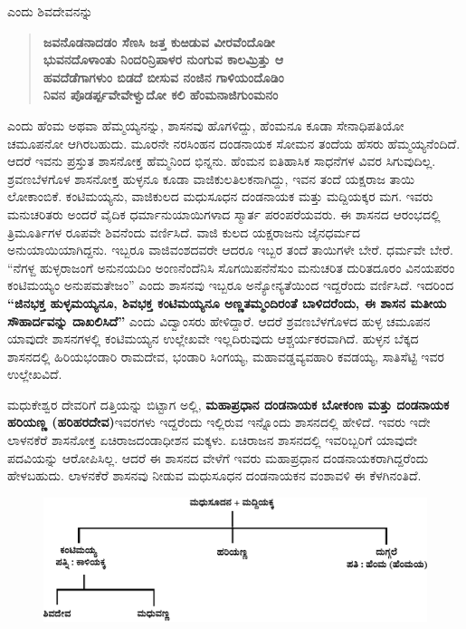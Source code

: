 \noindent
ಎಂದು ಶಿವದೇವನನ್ನು

\begin{verse}
\textbf{ಜವನೊಡನಾದಡಂ ಸೆಣಸಿ ಜತ್ತ ಕುಱಡುವ ವೀರವೆಂದೊಡೀ} \\\textbf{ ಭುವನದೊಳಾಂತು ನಿಂದರಿನ್ರಿಪಾಳರ ನುಂಗುವ ಕಾಲಮ್ರಿತ್ತು ಆ} \\\textbf{ ಹವದೆಡೆಗಾಗಳುಂ ಬಿಡದೆ ಬೀಸುವ ನಂಜಿನ ಗಾಳಿಯಂದೊಡಿಂ} \\\textbf{ ನಿವನ ಪೊಡರ್ಪ್ಪವೇವೇಳ್ವುದೋ ಕಲಿ ಹೆಂಮನಾಜಿಗುಂಮನಂ}
\end{verse}

\noindent
ಎಂದು ಹೆಂಮ ಅಥವಾ ಹೆಮ್ಮಯ್ಯನನ್ನು, ಶಾಸನವು ಹೊಗಳಿದ್ದು, ಹೆಂಮನೂ ಕೂಡಾ ಸೇನಾಧಿಪತಿಯೋ ಚಮೂಪನೋ ಆಗಿರಬಹುದು. ಮೂರನೇ ನರಸಿಂಹನ ದಂಡನಾಯಕ ಸೋಮನ ತಂದೆಯ ಹೆಸರು ಹೆಮ್ಮಯ್ಯನೆಂದಿದೆ. ಆದರೆ ಇವನು ಪ್ರಸ್ತುತ ಶಾಸನೋಕ್ತ ಹೆಮ್ಮನಿಂದ ಭಿನ್ನನು. ಹೆಂಮನ ಐತಿಹಾಸಿಕ ಸಾಧನೆಗಳ ವಿವರ ಸಿಗುವುದಿಲ್ಲ. ಶ್ರವಣಬೆಳಗೊಳ ಶಾಸನೋಕ್ತ ಹುಳ್ಳನೂ ಕೂಡಾ ವಾಜಿಕುಲತಿಲಕನಾಗಿದ್ದು, ಇವನ ತಂದೆ ಯಕ್ಷರಾಜ ತಾಯಿ ಲೋಕಾಂಬಿಕೆ. ಕಂಟಿಮಯ್ಯನು, ವಾಜಿಕುಲದ ಮಧುಸೂಧನ ದಂಡನಾಯಕ ಮತ್ತು ಮದ್ದಿಯಕ್ಕರ ಮಗ. ಇವರು ಮನುಚರಿತರು ಅಂದರೆ ವೈದಿಕ ಧರ್ಮಾನುಯಾಯಿಗಳಾದ ಸ್ಮಾರ್ತ ಪರಂಪರೆಯವರು. ಈ ಶಾಸನದ ಆರಂಭದಲ್ಲಿ ತ್ರಿಮೂರ್ತಿಗಳ ರೂಪವೇ ಶಿವನೆಂದು ವರ್ಣಿಸಿದೆ. ವಾಜಿ ಕುಲದ ಯಕ್ಷರಾಜನು ಜೈನಧರ್ಮದ ಅನುಯಾಯಿಯಾಗಿದ್ದನು. ಇಬ್ಬರೂ ವಾಜಿವಂಶದವರೇ ಆದರೂ ಇಬ್ಬರ ತಂದೆ ತಾಯಿಗಳೇ ಬೇರೆ. ಧರ್ಮವೇ ಬೇರೆ. “ನೆಗಳ್ದ ಹುಳ್ಳರಾಜಂಗೆ ಅನುನಯದಿಂ ಅಂಣನೆಂದೆನಿಸಿ ಸೊಗಯಿಪನೆನೆಸುಂ ಮನುಚರಿತ ದುರಿತದೂರಂ ವಿನಯಪರಂ ಕಂಟಿಮಯ್ಯಂ ಅನುಪಮತೇಜಂ” ಎಂದು ಶಾಸನವು ಇಬ್ಬರೂ ಅನ್ಯೋನ್ಯತೆಯಿಂದ ಇದ್ದರೆಂದು ವರ್ಣಿಸಿದೆ. ಇದರಿಂದ \textbf{“ಜಿನಭಕ್ತ ಹುಳ್ಳಮಯ್ಯನೂ, ಶಿವಭಕ್ತ ಕಂಟಿಮಯ್ಯನೂ ಅಣ್ಣತಮ್ಮಂದಿರಂತೆ ಬಾಳಿದರೆಂದು, ಈ ಶಾಸನ ಮತೀಯ ಸೌಹಾರ್ದವನ್ನು ದಾಖಲಿಸಿದೆ”} ಎಂದು ವಿದ್ವಾಂಸರು ಹೇಳಿದ್ದಾರೆ. ಆದರೆ ಶ್ರವಣಬೆಳಗೊಳದ ಹುಳ್ಳ ಚಮೂಪನ ಯಾವುದೇ ಶಾಸನಗಳಲ್ಲಿ ಕಂಟಿಮಯ್ಯನ ಉಲ್ಲೇಖವೇ ಇಲ್ಲದಿರುವುದು ಆಶ್ಚರ್ಯಕರವಾಗಿದೆ. ಹುಳ್ಳನ ಬೆಕ್ಕದ ಶಾಸನದಲ್ಲಿ ಹಿರಿಯಭಂಡಾರಿ ರಾಮದೇವ, ಭಂಡಾರಿ ಸಿಂಗಯ್ಯ, ಮಹಾವಡ್ಡವ್ಯವಹಾರಿ ಕವಡಯ್ಯ, ಸಾತಿಸೆಟ್ಟಿ ಇವರ ಉಲ್ಲೇಖವಿದೆ.

ಮಧುಕೇಶ್ವರ ದೇವರಿಗೆ ದತ್ತಿಯನ್ನು ಬಿಟ್ಟಾಗ ಅಲ್ಲಿ, \textbf{ಮಹಾಪ್ರಧಾನ ದಂಡನಾಯಕ ಬೋಕಂಣ ಮತ್ತು ದಂಡನಾಯಕ ಹರಿಯಣ್ಣ (ಹರಿಹರದೇವ)}ಇವರಗಳು ಇದ್ದರೆಂದು ಇಲ್ಲಿರುವ ಇನ್ನೊಂದು ಶಾಸನದಲ್ಲಿ ಹೇಳಿದೆ. ಇವರು ಇದೇ ಲಾಳನಕೆರೆ ಶಾಸನೋಕ್ತ ಏಚಿರಾಜದಂಡಾಧೀಶನ ಮಕ್ಕಳು. ಏಚಿರಾಜನ ಶಾಸನದಲ್ಲಿ ಇವರಿಬ್ಬರಿಗೆ ಯಾವುದೇ ಪದವಿಯನ್ನು ಆರೋಪಿಸಿಲ್ಲ. ಆದರೆ ಈ ಶಾಸನದ ವೇಳೆಗೆ ಇವರು ಮಹಾಪ್ರಧಾನ ದಂಡನಾಯಕರಾಗಿದ್ದರೆಂದು ಹೇಳಬಹುದು. ಲಾಳನಕೆರೆ ಶಾಸನವು ನೀಡುವ ಮಧುಸೂಧನ ದಂಡನಾಯಕನ ವಂಶಾವಳಿ ಈ ಕೆಳಗಿನಂತಿದೆ.

\begin{figure}[H]
\includegraphics[scale=1.17]{images/chap3/chap3fig27.jpeg}
\end{figure}


